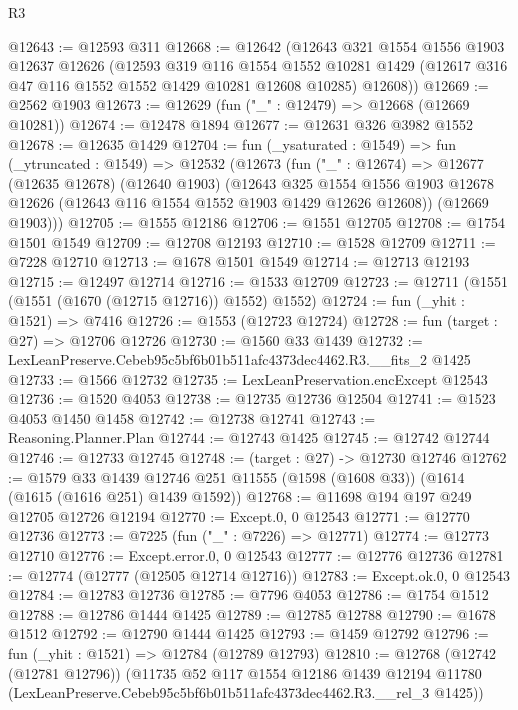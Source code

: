 \begin{lexlean}{R3}
\begin{coremodule}
@12643 := @12593 @311
@12668 := @12642
    (@12643
      @321
      @1554
      @1556
      @1903
      @12637
      @12626
      (@12593
        @319
        @116
        @1554
        @1552
        @10281
        @1429
        (@12617 @316 @47 @116 @1552 @1552 @1429 @10281 @12608 @10285)
        @12608))
@12669 := @2562 @1903
@12673 := @12629 (fun ("_" : @12479) => @12668 (@12669 @10281))
@12674 := @12478 @1894
@12677 := @12631 @326 @3982 @1552
@12678 := @12635 @1429
@12704 := fun (_ysaturated : @1549) =>
  fun (_ytruncated : @1549) =>
  @12532
    (@12673
      (fun ("_" : @12674) =>
      @12677
        (@12635 @12678)
        (@12640 @1903)
        (@12643
          @325
          @1554
          @1556
          @1903
          @12678
          @12626
          (@12643 @116 @1554 @1552 @1903 @1429 @12626 @12608))
        (@12669 @1903)))
@12705 := @1555 @12186
@12706 := @1551 @12705
@12708 := @1754 @1501 @1549
@12709 := @12708 @12193
@12710 := @1528 @12709
@12711 := @7228 @12710
@12713 := @1678 @1501 @1549
@12714 := @12713 @12193
@12715 := @12497 @12714
@12716 := @1533 @12709
@12723 := @12711 (@1551 (@1551 (@1670 (@12715 @12716)) @1552) @1552)
@12724 := fun (_yhit : @1521) => @7416
@12726 := @1553 (@12723 @12724)
@12728 := fun (target : @27) => @12706 @12726
@12730 := @1560 @33 @1439
@12732 := LexLeanPreserve.Cebeb95c5bf6b01b511afc4373dec4462.R3.__fits_2 @1425
@12733 := @1566 @12732
@12735 := LexLeanPreservation.encExcept @12543
@12736 := @1520 @4053
@12738 := @12735 @12736 @12504
@12741 := @1523 @4053 @1450 @1458
@12742 := @12738 @12741
@12743 := Reasoning.Planner.Plan
@12744 := @12743 @1425
@12745 := @12742 @12744
@12746 := @12733 @12745
@12748 := (target : @27) -> @12730 @12746
@12762 := @1579
    @33
    @1439
    @12746
    @251
    @11555
    (@1598 (@1608 @33))
    (@1614 (@1615 (@1616 @251) @1439 @1592))
@12768 := @11698 @194 @197 @249 @12705 @12726 @12194
@12770 := Except.{0, 0} @12543
@12771 := @12770 @12736
@12773 := @7225 (fun ("_" : @7226) => @12771)
@12774 := @12773 @12710
@12776 := Except.error.{0, 0} @12543
@12777 := @12776 @12736
@12781 := @12774 (@12777 (@12505 @12714 @12716))
@12783 := Except.ok.{0, 0} @12543
@12784 := @12783 @12736
@12785 := @7796 @4053
@12786 := @1754 @1512
@12788 := @12786 @1444 @1425
@12789 := @12785 @12788
@12790 := @1678 @1512
@12792 := @12790 @1444 @1425
@12793 := @1459 @12792
@12796 := fun (_yhit : @1521) => @12784 (@12789 @12793)
@12810 := @12768
    (@12742 (@12781 @12796))
    (@11735
      @52
      @117
      @1554
      @12186
      @1439
      @12194
      @11780
      (LexLeanPreserve.Cebeb95c5bf6b01b511afc4373dec4462.R3.__rel_3 @1425))

\end{coremodule}
\end{lexlean}
